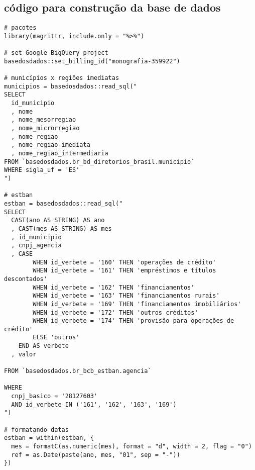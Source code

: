 \postextual

%
%
%
%
%

\begin{anexosenv}
\partanexos

\chapter{código para construção da base de dados}\label{anexo_a}

\begin{lstlisting}[frame=single]
# pacotes
library(magrittr, include.only = "%>%")

# set Google BigQuery project
basedosdados::set_billing_id("monografia-359922")

# municípios x regiões imediatas
municipios = basedosdados::read_sql("
SELECT
  id_municipio
  , nome
  , nome_mesorregiao
  , nome_microrregiao
  , nome_regiao
  , nome_regiao_imediata
  , nome_regiao_intermediaria
FROM `basedosdados.br_bd_diretorios_brasil.municipio`
WHERE sigla_uf = 'ES'
")

# estban
estban = basedosdados::read_sql("
SELECT
  CAST(ano AS STRING) AS ano
  , CAST(mes AS STRING) AS mes
  , id_municipio
  , cnpj_agencia
  , CASE
        WHEN id_verbete = '160' THEN 'operações de crédito'
        WHEN id_verbete = '161' THEN 'empréstimos e títulos descontados'
        WHEN id_verbete = '162' THEN 'financiamentos'
        WHEN id_verbete = '163' THEN 'financiamentos rurais'
        WHEN id_verbete = '169' THEN 'financiamentos imobiliários'
        WHEN id_verbete = '172' THEN 'outros créditos'
        WHEN id_verbete = '174' THEN 'provisão para operações de crédito'
        ELSE 'outros'
    END AS verbete
  , valor

FROM `basedosdados.br_bcb_estban.agencia`

WHERE
  cnpj_basico = '28127603'
  AND id_verbete IN ('161', '162', '163', '169')
")

# formatando datas
estban = within(estban, {
  mes = formatC(as.numeric(mes), format = "d", width = 2, flag = "0")
  ref = as.Date(paste(ano, mes, "01", sep = "-"))
})


\end{lstlisting}
\end{anexosenv}
